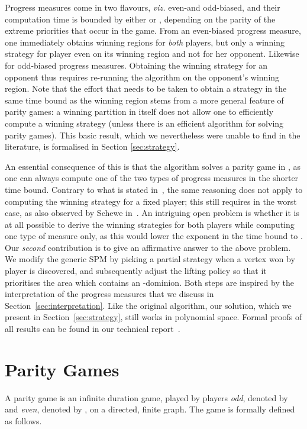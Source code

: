 \documentclass{eptcs}
\newcommand{\viz}{\emph{viz.}\xspace}
\begin{document}
Progress measures come in two flavours, \viz even-and odd-biased,
and their computation time is bounded by either  or
, depending on the parity of the extreme priorities that
occur in the game.
From an even-biased progress measure, one immediately obtains winning
regions for \emph{both} players, but only a winning strategy for
player even on its winning region and not for her opponent. Likewise
for odd-biased progress measures. Obtaining the winning strategy
for an opponent thus requires re-running the algorithm on the
opponent's winning region.  Note that the effort that needs to be
taken to obtain a strategy in the same time bound as the winning
region stems from a more general feature of parity games: a winning
partition in itself does not allow one to efficiently compute a
winning strategy (unless there is an efficient algorithm for solving
parity games). This basic result, which we nevertheless were unable
to find in the literature, is formalised in Section \ref{sec:strategy}.

An essential consequence of this is that the algorithm solves a
parity game in , as one can always compute one of
the two types of progress measures in the shorter time bound. Contrary
to what is stated in~\cite{Jur:00},
the same reasoning does not apply to computing the winning strategy for
a fixed player; this still requires  in the worst
case,  as also observed by Schewe in~\cite{Sch:07}.
An intriguing open problem is
whether it is at all possible to derive the winning strategies for
both players while computing one type of measure only, as this would
lower the exponent in the time bound to .  Our \emph{second}
contribution is to
give an affirmative answer to the above problem.  We modify the
generic SPM by picking a partial strategy when a vertex won by
player  is discovered, and subsequently adjust the lifting
policy so that it prioritises the area which contains an -dominion.
Both steps are inspired by the interpretation of the progress measures
that we discuss in Section~\ref{sec:interpretation}.
Like the original algorithm, our solution, which we present in
Section~\ref{sec:strategy}, still works in polynomial
space. 
Formal proofs of all results can be found in our technical report~\cite{GW:14}.
\section{Parity Games}

\label{sec:parity_games}

A parity game is an infinite duration game, played by players \emph{odd},
denoted by  and \emph{even}, denoted by , on a directed,
finite graph. The game is formally defined as follows.
\end{document}
